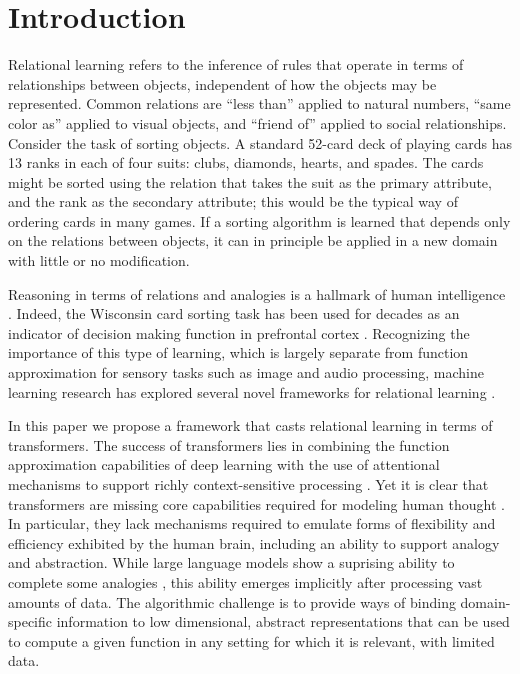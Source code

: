 \section{Introduction}
\label{sec:intro}

Relational learning refers to the inference of rules that operate in terms of
relationships between objects, independent of how the objects may be represented. Common relations are
``less than'' applied to natural numbers, ``same color as'' applied to visual objects, and ``friend of'' applied to
social relationships. Consider the task of sorting objects. A standard 52-card deck of playing cards has 13 ranks in
each of four suits: clubs, diamonds, hearts, and spades. The cards might be sorted using the relation that takes
the suit as the primary attribute, and the rank as the secondary attribute; this would be the typical 
way of ordering cards in many games. If a sorting algorithm is learned that depends 
only on the relations between objects, it can in principle be applied in a new domain with little 
or no modification. 

Reasoning in terms of relations and analogies is a hallmark of human intelligence 
\citep{snow,holyoak}.
Indeed, the Wisconsin card sorting task \citep{berg} has been used for decades as an indicator of decision making
function in prefrontal cortex \citep{monchi}. Recognizing the importance of this type of learning, which is largely
separate from function approximation for sensory tasks such as image and audio processing, machine learning research
has explored several novel frameworks for relational learning \citep{TEM, NTM,episodicControl,esbn,mondal23learned,
battaglia,barrett:2018,santoro1} .

In this paper we propose a framework that casts relational learning in terms of transformers. 
The success of transformers lies in combining the function approximation capabilities of deep learning with the use
of attentional mechanisms to support richly context-sensitive processing \citep{transformers,vaswani2017attention,
    kerg2020untangling}. Yet it is clear that transformers are missing core capabilities required for modeling human
thought \citep{mahowald2023dissociating}.  In particular, they lack mechanisms required to emulate forms of
flexibility and efficiency exhibited by the human brain, including an ability to support analogy and abstraction.
While large language models show a suprising ability to complete some analogies \citep{webb}, this ability 
emerges implicitly after processing vast amounts of data. The algorithmic challenge is to provide ways of binding domain-specific information to low dimensional, abstract representations that can be used to compute a given function in any setting for which it is relevant, with limited data.


